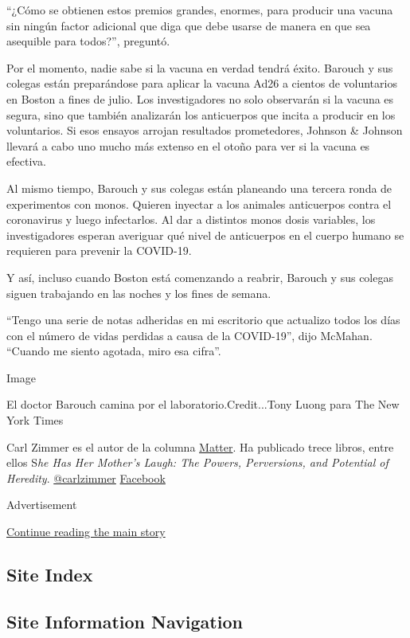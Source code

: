 ``¿Cómo se obtienen estos premios grandes, enormes, para producir una
vacuna sin ningún factor adicional que diga que debe usarse de manera en
que sea asequible para todos?'', preguntó.

Por el momento, nadie sabe si la vacuna en verdad tendrá éxito. Barouch
y sus colegas están preparándose para aplicar la vacuna Ad26 a cientos
de voluntarios en Boston a fines de julio. Los investigadores no solo
observarán si la vacuna es segura, sino que también analizarán los
anticuerpos que incita a producir en los voluntarios. Si esos ensayos
arrojan resultados prometedores, Johnson \& Johnson llevará a cabo uno
mucho más extenso en el otoño para ver si la vacuna es efectiva.

Al mismo tiempo, Barouch y sus colegas están planeando una tercera ronda
de experimentos con monos. Quieren inyectar a los animales anticuerpos
contra el coronavirus y luego infectarlos. Al dar a distintos monos
dosis variables, los investigadores esperan averiguar qué nivel de
anticuerpos en el cuerpo humano se requieren para prevenir la COVID-19.

Y así, incluso cuando Boston está comenzando a reabrir, Barouch y sus
colegas siguen trabajando en las noches y los fines de semana.

``Tengo una serie de notas adheridas en mi escritorio que actualizo
todos los días con el número de vidas perdidas a causa de la COVID-19'',
dijo McMahan. ``Cuando me siento agotada, miro esa cifra''.

Image

El doctor Barouch camina por el laboratorio.Credit...Tony Luong para The
New York Times

Carl Zimmer es el autor de la columna
\href{https://www.nytimes3xbfgragh.onion/column/matter}{Matter}. Ha
publicado trece libros, entre ellos S\emph{he Has Her Mother's Laugh:
The Powers, Perversions, and Potential of Heredity}.
\href{https://twitter.com/carlzimmer}{@carlzimmer} \textbar{}
\href{https://www.facebookcorewwwi.onion/carlzimmerauthor}{Facebook}

Advertisement

\protect\hyperlink{after-bottom}{Continue reading the main story}

\hypertarget{site-index}{%
\subsection{Site Index}\label{site-index}}

\hypertarget{site-information-navigation}{%
\subsection{Site Information
Navigation}\label{site-information-navigation}}

